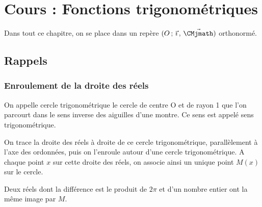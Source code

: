 \documentclass[11pt,fleqn, openany]{book} %
\begin{document}


\chapter{Cours : Fonctions trigonométriques}

Dans tout ce chapitre, on se place dans un repère $\Oij$ orthonormé.

\section{Rappels}

\subsection{Enroulement de la droite des réels}

\begin{definition}
On appelle cercle trigonométrique le cercle de centre O et de rayon 1 que l'on parcourt dans le sens inverse des aiguilles d'une montre. Ce sens est appelé sens trigonométrique.

On trace la droite des réels à droite de ce cercle trigonométrique, parallèlement à l'axe des ordonnées, puis on l'enroule autour d'une cercle trigonométrique. A chaque point $x$ sur cette droite des réels, on associe ainsi un unique point $M(x)$ sur le cercle.\end{definition}

\begin{center}
\end{center}

\begin{proposition}
Deux réels dont la différence est le produit de $2\pi$ et d'un nombre entier ont la même image par $M$.
\end{proposition}
\end{document}
